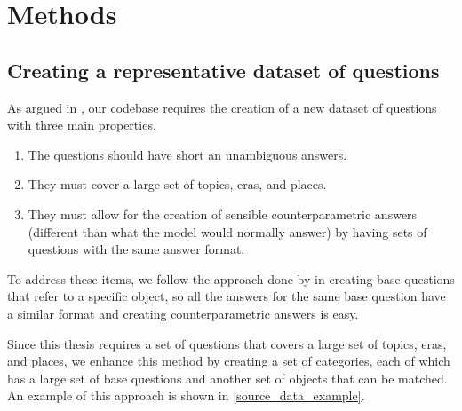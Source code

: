 \section{Methods}

\subsection{Creating a representative dataset of questions}
\label{creating_dataset}

As argued in , our codebase requires the creation of a new dataset of questions with three main properties.

\begin{enumerate}
	\item The questions should have short an unambiguous answers. \label{q_short}
	\item They must cover a large set of topics, eras, and places. \label{q_widespread}
	\item They must allow for the creation of sensible counterparametric answers (different than what the model would normally answer) by having sets of questions with the same answer format. \label{q_counterfactual}
\end{enumerate}

To address these items, we follow the approach done by \citeauthor{factual_recall} in creating base questions that refer to a specific object, so all the answers for the same base question have a similar format and creating counterparametric answers is easy.

Since this thesis requires a set of questions that covers a large set of topics, eras, and places, we enhance this method by creating a set of categories, each of which has a large set of base questions and another set of objects that can be matched.
An example of this approach is shown in \cref{source_data_example}.


